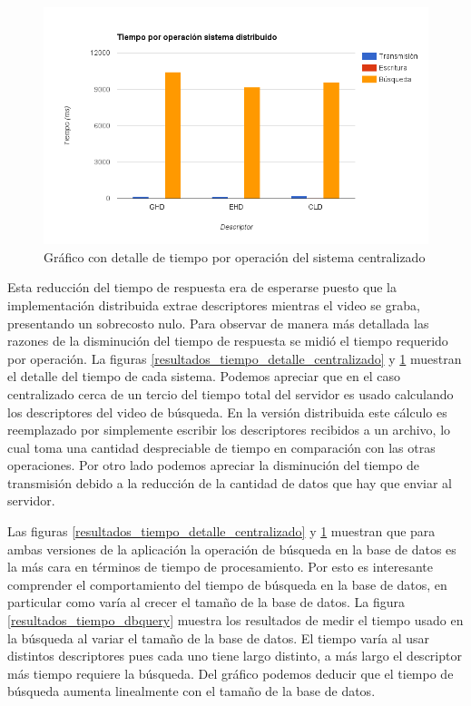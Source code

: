 	\begin{figure}[!h]
		\centering
		\includegraphics[width=\textwidth]{imagenes/cap5/resultados_tiempo_detalle_distribuido.png}
		\caption{Gráfico con detalle de tiempo por operación del sistema centralizado}
		\label{resultados_tiempo_detalle_distribuido}
	\end{figure}
	
Esta reducción del tiempo de respuesta era de esperarse puesto que la implementación distribuida extrae descriptores mientras el video se graba, presentando un sobrecosto nulo. Para observar de manera más detallada las razones de la disminución del tiempo de respuesta se midió el tiempo requerido por operación. La figuras \ref{resultados_tiempo_detalle_centralizado} y \ref{resultados_tiempo_detalle_distribuido} muestran el detalle del tiempo de cada sistema. Podemos apreciar que en el caso centralizado cerca de un tercio del tiempo total del servidor es usado calculando los descriptores del video de búsqueda. En la versión distribuida este cálculo es reemplazado por simplemente escribir los descriptores recibidos a un archivo, lo cual toma una cantidad despreciable de tiempo en comparación con las otras operaciones. Por otro lado podemos apreciar la disminución del tiempo de transmisión debido a la reducción de la cantidad de datos que hay que enviar al servidor.

Las figuras \ref{resultados_tiempo_detalle_centralizado} y \ref{resultados_tiempo_detalle_distribuido} muestran que para ambas versiones de la aplicación la operación de búsqueda en la base de datos es la más cara en términos de tiempo de procesamiento. Por esto es interesante comprender el comportamiento del tiempo de búsqueda en la base de datos, en particular como varía al crecer el tamaño de la base de datos. La figura \ref{resultados_tiempo_dbquery} muestra los resultados de medir el tiempo usado en la búsqueda al variar el tamaño de la base de datos. El tiempo varía al usar distintos descriptores pues cada uno tiene largo distinto, a más largo el descriptor más tiempo requiere la búsqueda. Del gráfico podemos deducir que el tiempo de búsqueda aumenta linealmente con el tamaño de la base de datos. 

